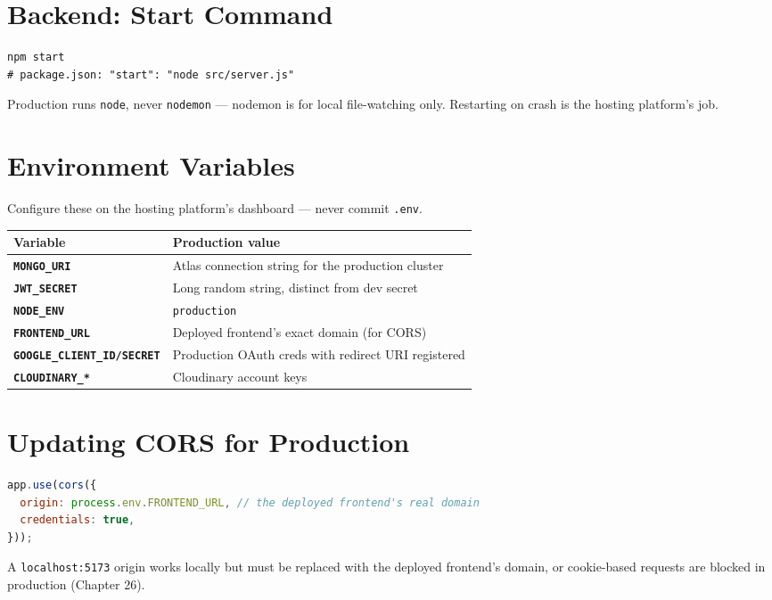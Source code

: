\section{Backend: Start Command}

\begin{lstlisting}
npm start
# package.json: "start": "node src/server.js"
\end{lstlisting}

Production runs \texttt{node}, never \texttt{nodemon} --- nodemon is for local file-watching only. Restarting on crash is the hosting platform's job.

\section{Environment Variables}

Configure these on the hosting platform's dashboard --- never commit \texttt{.env}.

\begin{tabularx}{\textwidth}{@{}>{\bfseries}p{4.2cm}X@{}}
\toprule
Variable & Production value \\
\midrule
\texttt{MONGO\_URI} & Atlas connection string for the production cluster \\
\texttt{JWT\_SECRET} & Long random string, distinct from dev secret \\
\texttt{NODE\_ENV} & \texttt{production} \\
\texttt{FRONTEND\_URL} & Deployed frontend's exact domain (for CORS) \\
\texttt{GOOGLE\_CLIENT\_ID/SECRET} & Production OAuth creds with redirect URI registered \\
\texttt{CLOUDINARY\_*} & Cloudinary account keys \\
\bottomrule
\end{tabularx}

\section{Updating CORS for Production}

\begin{lstlisting}[language=JavaScript]
app.use(cors({
  origin: process.env.FRONTEND_URL, // the deployed frontend's real domain
  credentials: true,
}));
\end{lstlisting}

A \texttt{localhost:5173} origin works locally but must be replaced with the deployed frontend's domain, or cookie-based requests are blocked in production (Chapter 26).

